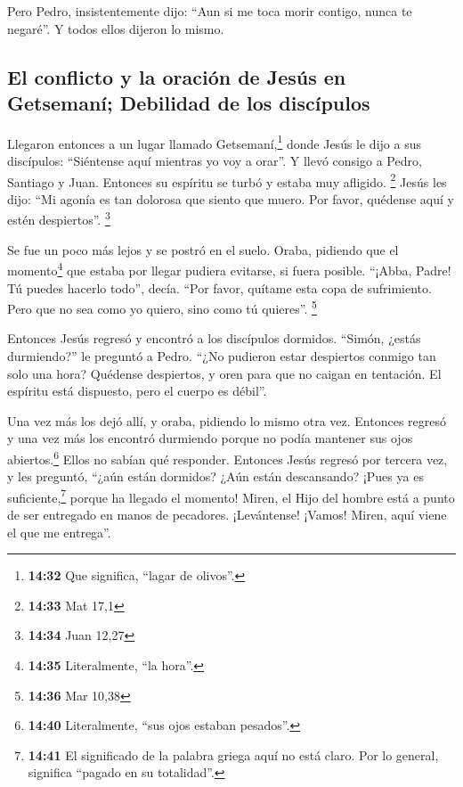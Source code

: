  Pero Pedro, insistentemente dijo: ``Aun si me toca morir
contigo, nunca te negaré''. Y todos ellos dijeron lo mismo.

\hypertarget{el-conflicto-y-la-oraciuxf3n-de-jesuxfas-en-getsemanuxed-debilidad-de-los-discuxedpulos}{%
\subsection{El conflicto y la oración de Jesús en Getsemaní; Debilidad
de los
discípulos}\label{el-conflicto-y-la-oraciuxf3n-de-jesuxfas-en-getsemanuxed-debilidad-de-los-discuxedpulos}}

 Llegaron entonces a un lugar llamado
Getsemaní,\footnote{\textbf{14:32} Que significa, ``lagar de olivos''.}
donde Jesús le dijo a sus discípulos: ``Siéntense aquí mientras yo voy a
orar''.  Y llevó consigo a Pedro, Santiago y Juan.
Entonces su espíritu se turbó y estaba muy afligido. \footnote{\textbf{14:33}
  Mat 17,1}  Jesús les dijo: ``Mi agonía es tan dolorosa
que siento que muero. Por favor, quédense aquí y estén despiertos''.
\footnote{\textbf{14:34} Juan 12,27}

 Se fue un poco más lejos y se postró en el suelo. Oraba,
pidiendo que el momento\footnote{\textbf{14:35} Literalmente, ``la
  hora''.} que estaba por llegar pudiera evitarse, si fuera posible.
 ``¡Abba, Padre! Tú puedes hacerlo todo'', decía. ``Por
favor, quítame esta copa de sufrimiento. Pero que no sea como yo quiero,
sino como tú quieres''. \footnote{\textbf{14:36} Mar 10,38}

 Entonces Jesús regresó y encontró a los discípulos
dormidos. ``Simón, ¿estás durmiendo?'' le preguntó a Pedro. ``¿No
pudieron estar despiertos conmigo tan solo una hora? 
Quédense despiertos, y oren para que no caigan en tentación. El espíritu
está dispuesto, pero el cuerpo es débil''.

 Una vez más los dejó allí, y oraba, pidiendo lo mismo
otra vez.  Entonces regresó y una vez más los encontró
durmiendo porque no podía mantener sus ojos abiertos.\footnote{\textbf{14:40}
  Literalmente, ``sus ojos estaban pesados''.} Ellos no sabían qué
responder.  Entonces Jesús regresó por tercera vez, y les
preguntó, ``¿aún están dormidos? ¿Aún están descansando? ¡Pues ya es
suficiente,\footnote{\textbf{14:41} El significado de la palabra griega
  aquí no está claro. Por lo general, significa ``pagado en su
  totalidad''.} porque ha llegado el momento! Miren, el Hijo del hombre
está a punto de ser entregado en manos de pecadores. 
¡Levántense! ¡Vamos! Miren, aquí viene el que me entrega''.

